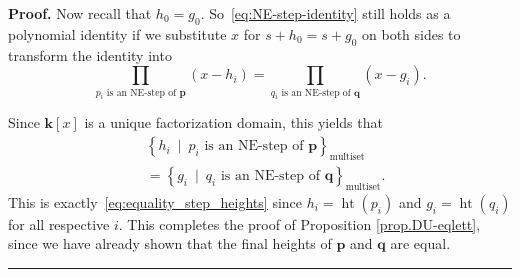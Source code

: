 \documentclass[numbers=enddot,12pt,final,onecolumn,notitlepage]{scrartcl}%
\theoremstyle{definition}
\newenvironment{proof}[1][Proof]{\noindent\textbf{#1.} }{\ \rule{0.5em}{0.5em}}
\newcommand{\kk}{\mathbf{k}}
\newcommand{\pp}{\mathbf{p}}
\newcommand{\qq}{\mathbf{q}}
\newcommand{\htt}{\operatorname{ht}}
\newcommand{\multiset}{\operatorname{multiset}}
\newenvironment{vershort}{}{}
\begin{document}
\begin{vershort}
\begin{proof}
Now recall that $h_{0} =g_{0}$. So~\eqref{eq:NE-step-identity} still holds
as a polynomial identity if we substitute $x$ for $s + h_0 = s + g_0$
on both sides to transform the identity into%
\[
\prod_{p_{i}\text{ is an NE-step of }\pp}\left(  x-h_{i}\right)
=\prod_{q_{i}\text{ is an NE-step of }\qq}\left(  x-g_{i}\right)  .
\]


Since $\kk\left[  x\right]  $ is a unique factorization domain, this
yields that%
\begin{align*}
&  \left\{  h_{i}\ \mid\ p_{i}\text{ is an NE-step of }\pp\right\}
_{\multiset}\\
&  =\left\{  g_{i}\ \mid\ q_{i}\text{ is an NE-step of }\qq\right\}
_{\multiset}.
\end{align*}
This is exactly~\eqref{eq:equality_step_heights} since $h_{i}=\htt\left(  p_{i}\right)  $ and $g_{i}%
=\htt\left(  q_{i}\right)  $ for all respective $i$. This
completes the proof of Proposition \ref{prop.DU-eqlett}, since we have already
shown that the final heights of $\pp$ and $\qq$ are equal.
\end{proof}
\end{vershort}
\end{document}
